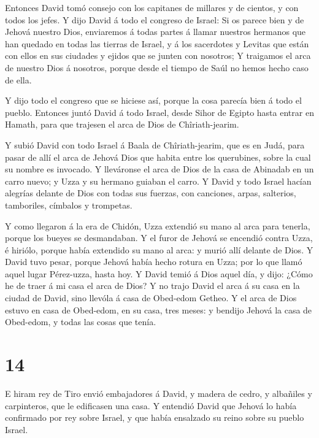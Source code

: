  Entonces David tomó consejo con los capitanes de millares y
de cientos, y con todos los jefes.  Y dijo David á todo el
congreso de Israel: Si os parece bien y de Jehová nuestro Dios,
enviaremos á todas partes á llamar nuestros hermanos que han quedado en
todas las tierras de Israel, y á los sacerdotes y Levitas que están con
ellos en sus ciudades y ejidos que se junten con nosotros; 
Y traigamos el arca de nuestro Dios á nosotros, porque desde el tiempo
de Saúl no hemos hecho caso de ella.

 Y dijo todo el congreso que se hiciese así, porque la cosa
parecía bien á todo el pueblo.  Entonces juntó David á todo
Israel, desde Sihor de Egipto hasta entrar en Hamath, para que trajesen
el arca de Dios de Chîriath-jearim.

 Y subió David con todo Israel á Baala de Chîriath-jearim,
que es en Judá, para pasar de allí el arca de Jehová Dios que habita
entre los querubines, sobre la cual su nombre es invocado. 
Y lleváronse el arca de Dios de la casa de Abinadab en un carro nuevo; y
Uzza y su hermano guiaban el carro.  Y David y todo Israel
hacían alegrías delante de Dios con todas sus fuerzas, con canciones,
arpas, salterios, tamboriles, címbalos y trompetas.

 Y como llegaron á la era de Chidón, Uzza extendió su mano
al arca para tenerla, porque los bueyes se desmandaban.  Y
el furor de Jehová se encendió contra Uzza, é hiriólo, porque había
extendido su mano al arca: y murió allí delante de Dios.  Y
David tuvo pesar, porque Jehová había hecho rotura en Uzza; por lo que
llamó aquel lugar Pérez-uzza, hasta hoy.  Y David temió á
Dios aquel día, y dijo: ¿Cómo he de traer á mi casa el arca de Dios?
 Y no trajo David el arca á su casa en la ciudad de David,
sino llevóla á casa de Obed-edom Getheo.  Y el arca de Dios
estuvo en casa de Obed-edom, en su casa, tres meses: y bendijo Jehová la
casa de Obed-edom, y todas las cosas que tenía.

\hypertarget{section-13}{%
\section{14}\label{section-13}}

 E hiram rey de Tiro envió embajadores á David, y madera de
cedro, y albañiles y carpinteros, que le edificasen una casa.
 Y entendió David que Jehová lo había confirmado por rey
sobre Israel, y que había ensalzado su reino sobre su pueblo Israel.

